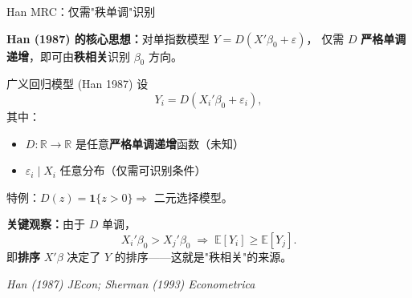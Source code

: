 \documentclass[aspectratio=169, 10pt]{beamer}
\begin{document}
\begin{frame}{Han MRC：仅需"秩单调"识别}

  \textbf{Han (1987) 的核心思想：}对单指数模型 $Y = D(X'\beta_0 + \varepsilon)$，
  仅需 $D$ \textbf{严格单调递增}，即可由\textbf{秩相关}识别 $\beta_0$ 方向。

  \begin{definitionbox}{{广义回归模型 (Han 1987)}}
    设
    $$Y_i = D(X_i'\beta_0 + \varepsilon_i),$$
    其中：
    \begin{itemize}\setlength{\itemsep}{1pt}
      \item $D: \mathbb{R} \to \mathbb{R}$ 是任意\textbf{严格单调递增}函数（未知）
      \item $\varepsilon_i \mid X_i$ 任意分布（仅需可识别条件）
    \end{itemize}
    特例：$D(z) = \mathbf{1}\{z > 0\} \Rightarrow$ 二元选择模型。
  \end{definitionbox}

  \begin{keybox}
    \textbf{关键观察：}由于 $D$ 单调，
    $$X_i'\beta_0 > X_j'\beta_0 \;\Longrightarrow\; \mathbb{E}[Y_i] \geq \mathbb{E}[Y_j].$$
    即\textbf{排序} $X'\beta$ 决定了 $Y$ 的排序——这就是"秩相关"的来源。
  \end{keybox}

  \hfill{\scriptsize\textit{Han (1987) JEcon; Sherman (1993) Econometrica}}

\end{frame}
\end{document}
